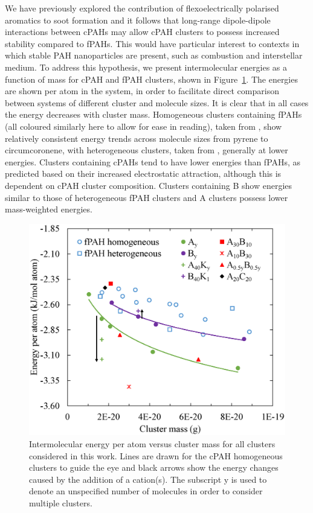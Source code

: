 We have previously explored the contribution of flexoelectrically polarised aromatics to soot formation \cite{Martin2018flexo} and it follows that long-range dipole-dipole interactions between cPAHs may allow cPAH clusters to possess increased stability compared to fPAHs.  This would have particular interest to contexts in which stable PAH nanoparticles are present, such as combustion and interstellar medium.  To address this hypothesis, we present intermolecular energies as a function of mass for cPAH and fPAH clusters, shown in Figure~\ref{fig:energies}.  The energies are shown per atom in the system, in order to facilitate direct comparison between systems of different cluster and molecule sizes. It is clear that in all cases the energy decreases with cluster mass. Homogeneous clusters containing fPAHs (all coloured similarly here to allow for ease in reading), taken from \citet{chen2014size,chen2015solid}, show relatively consistent energy trends across molecule sizes from pyrene to circumcoronene, with heterogeneous clusters, taken from \citet{bowal2018partitioning}, generally at lower energies. Clusters containing cPAHs tend to have lower energies than fPAHs, as predicted based on their increased electrostatic attraction, although this is dependent on cPAH cluster composition. Clusters containing B show energies similar to those of heterogeneous fPAH clusters and A clusters possess lower mass-weighted energies.
%
\begin{figure}[!tbh]
\centering
\includegraphics[width=0.8\linewidth]{Figures/energies.eps}
\caption{Intermolecular energy per atom versus cluster mass for all clusters considered in this work. Lines are drawn for the cPAH homogeneous clusters to guide the eye and black arrows show the energy changes caused by the addition of a cation(s). The subscript y is used to denote an unspecified number of molecules in order to consider multiple clusters.}
\label{fig:energies}
\end{figure}

